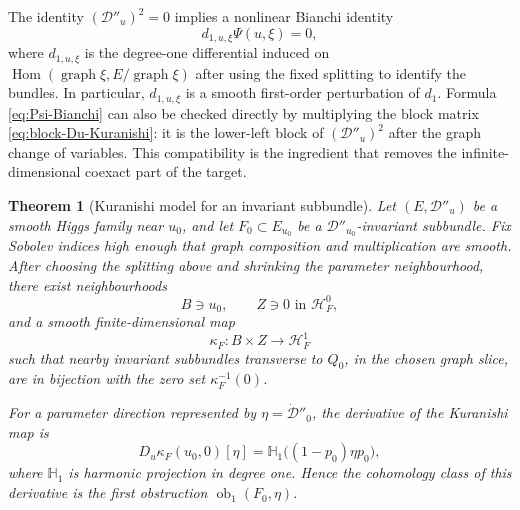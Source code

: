 \documentclass[11pt,reqno]{amsart}
\newtheorem{theorem}{Theorem}[section]
\theoremstyle{definition}
\theoremstyle{remark}
\newcommand{\cD}{\mathcal D}
\newcommand{\cH}{\mathcal H}
\newcommand{\Hom}{\operatorname{Hom}}
\begin{document}
The identity $(\cD''_u)^2=0$ implies a nonlinear Bianchi identity
\begin{equation}\label{eq:Psi-Bianchi}
  d_{1,u,\xi}\Psi(u,\xi)=0,
\end{equation}
where $d_{1,u,\xi}$ is the degree-one differential induced on
$\Hom(\operatorname{graph}\xi,E/\operatorname{graph}\xi)$ after using the fixed splitting to identify the bundles.  In particular, $d_{1,u,\xi}$ is a smooth first-order perturbation of $d_1$.  Formula \eqref{eq:Psi-Bianchi} can also be checked directly by multiplying the block matrix \eqref{eq:block-Du-Kuranishi}: it is the lower-left block of $(\cD''_u)^2$ after the graph change of variables.  This compatibility is the ingredient that removes the infinite-dimensional coexact part of the target.

\begin{theorem}[Kuranishi model for an invariant subbundle]\label{thm:kuranishi-subobject}
Let $(E,\cD''_u)$ be a smooth Higgs family near $u_0$, and let $F_0\subset E_{u_0}$ be a $\cD''_{u_0}$-invariant subbundle.  Fix Sobolev indices high enough that graph composition and multiplication are smooth.  After choosing the splitting above and shrinking the parameter neighbourhood, there exist neighbourhoods
\[
  B\ni u_0,
  \qquad
  Z\ni0\text{ in }\cH^0_F,
\]
and a smooth finite-dimensional map
\begin{equation}\label{eq:kuranishi-subobject-map}
  \kappa_F:B\times Z\longrightarrow\cH^1_F
\end{equation}
such that nearby invariant subbundles transverse to $Q_0$, in the chosen graph slice, are in bijection with the zero set $\kappa_F^{-1}(0)$.

For a parameter direction represented by $\eta=\dot{\cD}''_0$, the derivative of the Kuranishi map is
\begin{equation}\label{eq:kuranishi-derivative-ob1}
  D_u\kappa_F(u_0,0)[\eta]
  =\mathbb H_1\bigl((1-p_0)\eta p_0\bigr),
\end{equation}
where $\mathbb H_1$ is harmonic projection in degree one.  Hence the cohomology class of this derivative is the first obstruction $\operatorname{ob}_1(F_0,\eta)$.
\end{theorem}
\end{document}
